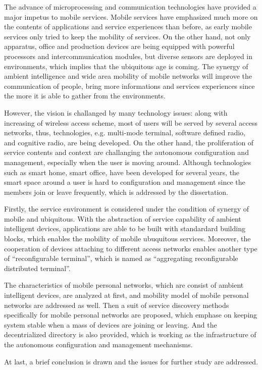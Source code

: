 The advance of microprocessing and communication technologies have provided a major impetus to mobile services. Mobile services have emphasized much more on the contents of applications and service experiences than before, as early mobile services only tried to keep the mobility of services. On the other hand, not only apparatus, office and production devices are being equipped with powerful processors and intercommunication modules, but diverse sensors are deployed in environments, which implies that the ubiquitous age is coming. The synergy of ambient intelligence and wide area mobility of mobile networks will improve the communication of people, bring more informations and services experiences since the more it is able to gather from the environments.

However, the vision is challanged by many technology issues: along with increasing of wireless access scheme, most of users will be served by several access networks, thus, technologies, e.g. multi-mode terminal, software defined radio, and cognitive radio, are being developed. On the other hand, the proliferation of service contents and context are challanging the autonomous configuration and management, especially when the user is moving around. Although technologies such as smart home, smart office, have been developed for several years, the smart space around a user is hard to configuration and management since the members join or leave frequently, which is addressed by the dissertation.

Firstly, the service environment is considered under the condition of synergy of mobile and ubiquitous. With the abstraction of service capability of ambient intelligent devices, applications are able to be built with standardard building blocks, which enables the mobility of mobile ubuquitous services. Moreover, the cooperation of devices attaching to different access networks enables another type of ``reconfigurable terminal'', which is named as ``aggregating reconfigurable distributed terminal''.

The characteristics of mobile personal networks, which are consist of ambient intelligent devices, are analyzed at first, and mobility model of mobile personal networks are addressed as well. Then a suit of service discovery methods specifically for mobile personal networks are proposed, which emphase on keeping system stable when a mass of devices are joining or leaving. And the decentrialized directory is also provided, which is working as the infrastructure of the autonomous configuration and management mechanisms.

At last, a brief conclusion is drawn and the issues for further study are addressed.
